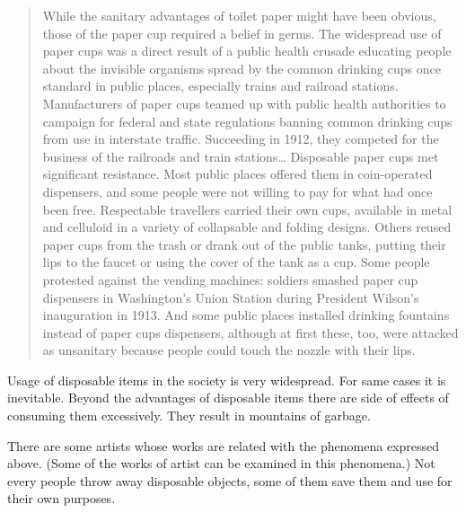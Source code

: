 \begin{quote}
While the sanitary advantages of toilet paper might have been obvious, those of the paper cup required a belief in germs. The widespread use of paper cups was a direct result of a public health crusade educating people about the invisible organisms spread by the common drinking cups once standard in public places, especially trains and railroad stations. Manufacturers of paper cups teamed up with public health authorities to campaign for federal and state regulations banning common drinking cups from use in interstate traffic. Succeeding in 1912, they competed for the business of the railroads and train stations\ldots
Disposable paper cups met significant resistance. Most public places offered them in coin-operated dispensers, and some people were not willing to pay for what had once been free. Respectable travellers carried their own cups, available in metal and celluloid in a variety of collapsable and folding designs. Others reused paper cups from the trash or drank out of the public tanks, putting their lips to the faucet or using the cover of the tank as a cup. Some people protested against the vending machines: soldiers smashed paper cup dispensers in Washington’s Union Station during President Wilson’s inauguration in 1913. And some public places installed drinking fountains instead of paper cups dispensers, although at first these, too, were attacked as unsanitary because people could touch the nozzle with their lips.
\end{quote}

Usage of disposable items in the society is very widespread. For same cases it is inevitable. Beyond the advantages of disposable items there are side of effects of consuming them excessively. They result in mountains of garbage.

 





%
%
There are some artists whose works are related with the phenomena expressed above. (Some of the works of artist can be examined in this phenomena.) Not every people throw away disposable objects, some of them save them and use for their own purposes. 


